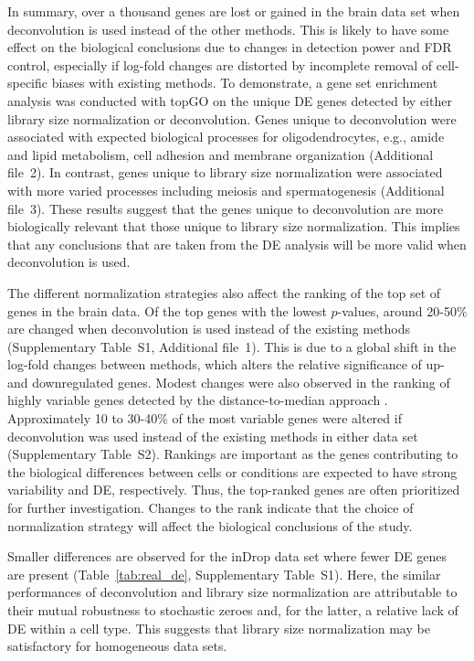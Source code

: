 \documentclass{bmcart}
\newcommand{\supprank}{S1}
\newcommand{\suppHVG}{S2}
\begin{document}
In summary, over a thousand genes are lost or gained in the brain data set when deconvolution is used instead of the other methods.
This is likely to have some effect on the biological conclusions due to changes in detection power and FDR control, 
    especially if log-fold changes are distorted by incomplete removal of cell-specific biases with existing methods.
To demonstrate, a gene set enrichment analysis was conducted with topGO \cite{alexa2010topgo} on the unique DE genes detected by either library size normalization or deconvolution.
Genes unique to deconvolution were associated with expected biological processes for oligodendrocytes, e.g., amide and lipid metabolism, cell adhesion and membrane organization (Additional file~2).
In contrast, genes unique to library size normalization were associated with more varied processes including meiosis and spermatogenesis (Additional file~3).
These results suggest that the genes unique to deconvolution are more biologically relevant that those unique to library size normalization.
This implies that any conclusions that are taken from the DE analysis will be more valid when deconvolution is used.

The different normalization strategies also affect the ranking of the top set of genes in the brain data.
Of the top genes with the lowest $p$-values, around 20-50\% are changed when deconvolution is used instead of the existing methods (Supplementary Table~\supprank{}, Additional file~1).
This is due to a global shift in the log-fold changes between methods, which alters the relative significance of up- and downregulated genes.
Modest changes were also observed in the ranking of highly variable genes detected by the distance-to-median approach \cite{kolod2015single}.
Approximately 10 to 30-40\% of the most variable genes were altered if deconvolution was used instead of the existing methods in either data set (Supplementary Table~\suppHVG{}).
Rankings are important as the genes contributing to the biological differences between cells or conditions are expected to have strong variability and DE, respectively.
Thus, the top-ranked genes are often prioritized for further investigation.
Changes to the rank indicate that the choice of normalization strategy will affect the biological conclusions of the study.

Smaller differences are observed for the inDrop data set where fewer DE genes are present (Table~\ref{tab:real_de}, Supplementary Table~\supprank{}).
Here, the similar performances of deconvolution and library size normalization are attributable to their mutual robustness to stochastic zeroes and, for the latter, a relative lack of DE within a cell type.
This suggests that library size normalization may be satisfactory for homogeneous data sets.
\end{document}
